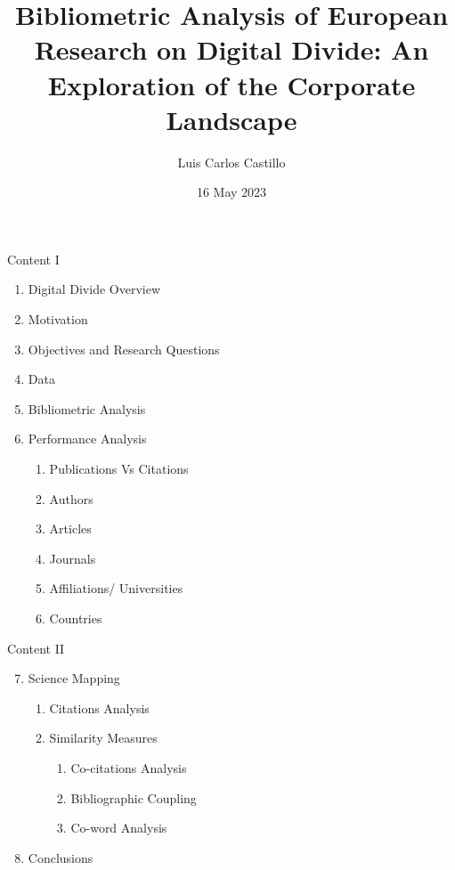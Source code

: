 \documentclass[
  ignorenonframetext,
]{beamer}
\title{Bibliometric Analysis of European Research on Digital Divide: An
Exploration of the Corporate Landscape}
\author{Luis Carlos Castillo}
\date{16 May 2023}
\institute{University of Urbino\\
Ph.D.~Program in Global Studies}
\providecommand{\tightlist}{%
  \setlength{\itemsep}{0pt}\setlength{\parskip}{0pt}}
\begin{document}
\frame{\titlepage}

\begin{frame}{Content I}
\protect\hypertarget{content-i}{}
\begin{enumerate}
\item
  Digital Divide Overview
\item
  Motivation
\item
  Objectives and Research Questions
\item
  Data
\item
  Bibliometric Analysis
\item
  Performance Analysis

  \begin{enumerate}
  \tightlist
  \item
    Publications Vs Citations
  \item
    Authors
  \item
    Articles
  \item
    Journals
  \item
    Affiliations/ Universities
  \item
    Countries
  \end{enumerate}
\end{enumerate}
\end{frame}

\begin{frame}{Content II}
\protect\hypertarget{content-ii}{}
\begin{enumerate}
\setcounter{enumi}{6}
\item
  Science Mapping

  \begin{enumerate}
  \tightlist
  \item
    Citations Analysis
  \item
    Similarity Measures

    \begin{enumerate}
    \tightlist
    \item
      Co-citations Analysis
    \item
      Bibliographic Coupling
    \item
      Co-word Analysis
    \end{enumerate}
  \end{enumerate}
\item
  Conclusions
\end{enumerate}
\end{frame}
\end{document}
